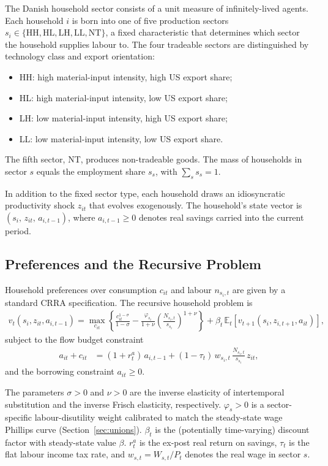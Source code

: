 \documentclass[12pt,a4paper]{article}
\newcommand{\E}{\mathbb{E}}
\begin{document}
The Danish household sector consists of a unit measure of infinitely-lived agents. Each household $i$ is born into one of five production sectors $s_i \in \{\text{HH}, \text{HL}, \text{LH}, \text{LL}, \text{NT}\}$, a fixed characteristic that determines which sector the household supplies labour to. The four tradeable sectors are distinguished by technology class and export orientation:
\begin{itemize}
    \item HH: high material-input intensity, high US export share;
    \item HL: high material-input intensity, low US export share;
    \item LH: low material-input intensity, high US export share;
    \item LL: low material-input intensity, low US export share.
\end{itemize}
The fifth sector, NT, produces non-tradeable goods. The mass of households in sector $s$ equals the employment share $s_s$, with $\sum_s s_s = 1$.

In addition to the fixed sector type, each household draws an idiosyncratic productivity shock $z_{it}$ that evolves exogenously. The household's state vector is $(s_i,\, z_{it},\, a_{i,t-1})$, where $a_{i,t-1} \geq 0$ denotes real savings carried into the current period.

\subsection{Preferences and the Recursive Problem}

Household preferences over consumption $c_{it}$ and labour $n_{s_i,t}$ are given by a standard CRRA specification. The recursive household problem is
\begin{align}
    v_t(s_i, z_{it}, a_{i,t-1}) = \max_{c_{it}} \left\{
        \frac{c_{it}^{1-\sigma}}{1-\sigma}
        - \frac{\varphi_{s_i}}{1+\nu}\left(\frac{N_{s_i,t}}{s_{s_i}}\right)^{1+\nu}
    \right\}
    + \beta_t\,\E_t\!\left[v_{t+1}(s_i, z_{i,t+1}, a_{it})\right],
    \label{eq:vf}
\end{align}
subject to the flow budget constraint
\begin{align}
    a_{it} + c_{it} &= (1 + r^a_t)\,a_{i,t-1}
        + (1-\tau_t)\,w_{s_i,t}\,\frac{N_{s_i,t}}{s_{s_i}}\,z_{it},
    \label{eq:budget}
\end{align}
and the borrowing constraint $a_{it} \geq 0$.

The parameters $\sigma > 0$ and $\nu > 0$ are the inverse elasticity of intertemporal substitution and the inverse Frisch elasticity, respectively. $\varphi_s > 0$ is a sector-specific labour-disutility weight calibrated to match the steady-state wage Phillips curve (Section~\ref{sec:unions}). $\beta_t$ is the (potentially time-varying) discount factor with steady-state value $\beta$. $r^a_t$ is the ex-post real return on savings, $\tau_t$ is the flat labour income tax rate, and $w_{s,t} = W_{s,t}/P_t$ denotes the real wage in sector $s$.
\end{document}
